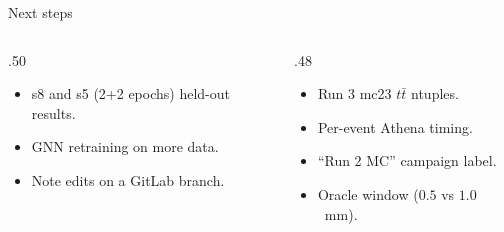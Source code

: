 \begin{frame}{Next steps}
\begin{columns}[T]\begin{column}{.50\linewidth}
\begin{itemize}\small\setlength\itemsep{.3em}
\item s8 and s5 (2+2 epochs) held-out results.
\item GNN retraining on more data.
\item Note edits on a GitLab branch.
\end{itemize}
\end{column}\begin{column}{.48\linewidth}
\begin{itemize}\small\setlength\itemsep{.3em}
\item Run 3 mc23 $t\bar t$ ntuples.
\item Per-event Athena timing.
\item ``Run 2 MC'' campaign label.
\item Oracle window ($0.5$ vs $1.0$~mm).
\end{itemize}
\end{column}\end{columns}
\end{frame}


